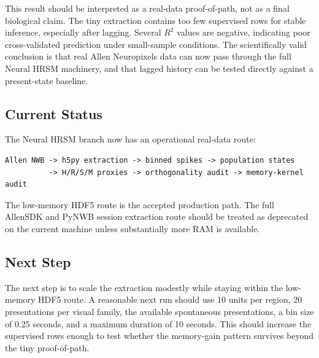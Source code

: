 This result should be interpreted as a real-data proof-of-path, not as a final biological claim. The tiny extraction contains too few supervised rows for stable inference, especially after lagging. Several \(R^2\) values are negative, indicating poor cross-validated prediction under small-sample conditions. The scientifically valid conclusion is that real Allen Neuropixels data can now pass through the full Neural HRSM machinery, and that lagged history can be tested directly against a present-state baseline.

\subsection{Current Status}

The Neural HRSM branch now has an operational real-data route:

\begin{verbatim}
Allen NWB -> h5py extraction -> binned spikes -> population states
          -> H/R/S/M proxies -> orthogonality audit -> memory-kernel audit
\end{verbatim}

The low-memory HDF5 route is the accepted production path. The full AllenSDK and PyNWB session extraction route should be treated as deprecated on the current machine unless substantially more RAM is available.

\subsection{Next Step}

The next step is to scale the extraction modestly while staying within the low-memory HDF5 route. A reasonable next run should use 10 units per region, 20 presentations per visual family, the available spontaneous presentations, a bin size of 0.25 seconds, and a maximum duration of 10 seconds. This should increase the supervised rows enough to test whether the memory-gain pattern survives beyond the tiny proof-of-path.
